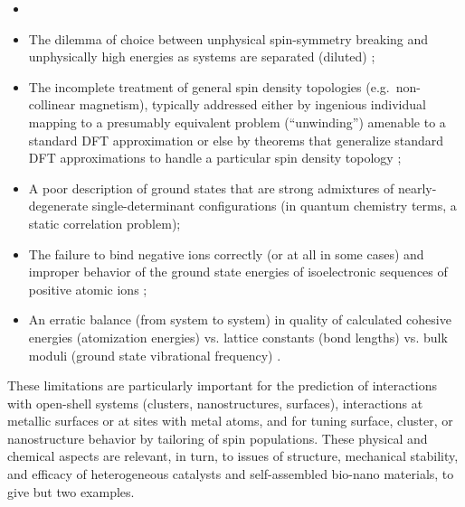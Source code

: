 \documentclass[nofootinbib,floatfix,aps,pra,preprint]{revtex4}
\begin{document}
\begin{itemize}
\item \textrm{\vspace{-0.21cm} }

\item \textrm{The dilemma of choice between unphysical spin-symmetry
breaking and unphysically high energies as systems are separated (diluted) 
\cite{PerdewSavin}; \vspace{-0.21cm} }

\item \textrm{The incomplete treatment of general spin density topologies
(e.g.~non-collinear magnetism), typically addressed either by ingenious
individual mapping to a presumably equivalent problem (``unwinding'')
amenable to a standard DFT approximation \cite{Kleinman98,Oda} or else by
theorems that generalize standard DFT approximations to handle a particular
spin density topology \cite{Capelle00}; \vspace{-0.21cm} }

\item \textrm{A poor description of ground states that are strong admixtures
of nearly-degenerate single-determinant configurations (in quantum chemistry
terms, a static correlation problem); \vspace{-0.21cm} }

\item \textrm{The failure to bind negative ions correctly (or at all in some
cases) \cite{NRSBT97} and improper behavior of the ground state energies of
isoelectronic sequences of positive atomic ions \cite{Davidson98}; \vspace{%
-0.21cm} }

\item \textrm{An erratic balance (from system to system) in quality of
calculated cohesive energies (atomization energies) vs. lattice constants
(bond lengths) vs. bulk moduli (ground state vibrational frequency) \cite%
{Zupan98,SBT97a}. \vspace{-0.21cm} }
\end{itemize}

\textrm{These limitations are particularly important for the prediction of
interactions with open-shell systems (clusters, nanostructures, surfaces),
interactions at metallic surfaces or at sites with metal atoms, and for
tuning surface, cluster, or nanostructure behavior by tailoring of spin
populations. These physical and chemical aspects are relevant, in turn, to
issues of structure, mechanical stability, and efficacy of heterogeneous
catalysts and self-assembled bio-nano materials, to give but two examples. }
\end{document}
